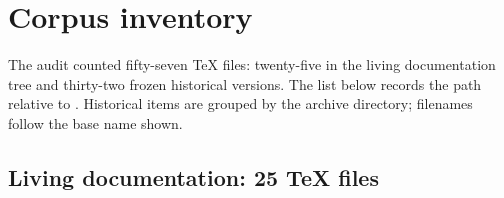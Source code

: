 \documentclass[11pt,oneside]{article}
\theoremstyle{definition}
\theoremstyle{remark}
\begin{document}
\appendix

\section{Corpus inventory}\label{p2:app:inventory}

The audit counted fifty-seven TeX files: twenty-five in the living documentation
tree and thirty-two frozen historical versions. The list below records the path
relative to . Historical items are grouped by
the archive directory; filenames follow the base name shown.

\subsection{Living documentation: 25 TeX files}
\end{document}
